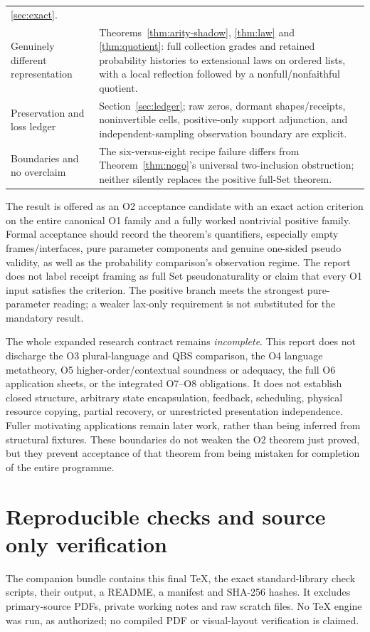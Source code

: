 \documentclass[11pt,a4paper]{article}
\theoremstyle{definition}
\begin{document}
\begin{longtable}{@{}p{.29\linewidth}p{.65\linewidth}@{}}
\ref{sec:exact}.\\
Genuinely different representation&Theorems~\ref{thm:arity-shadow},
\ref{thm:law} and \ref{thm:quotient}: full collection grades and retained
probability histories to extensional laws on ordered lists, with a local
reflection followed by a nonfull/nonfaithful quotient.\\
Preservation and loss ledger&Section~\ref{sec:ledger}; raw zeros, dormant
shapes/receipts, noninvertible cells, positive-only support adjunction, and
independent-sampling observation boundary are explicit.\\
Boundaries and no overclaim&The six-versus-eight recipe failure differs
from Theorem~\ref{thm:nogo}'s universal two-inclusion obstruction; neither
silently replaces the positive full-Set theorem.\\
\bottomrule
\end{longtable}

The result is offered as an O2 acceptance candidate with an exact action
criterion on the entire canonical O1 family and a fully worked nontrivial
positive family. Formal acceptance should record the theorem's quantifiers,
especially empty frames/interfaces, pure parameter components and genuine
one-sided pseudo validity, as well as the probability comparison's observation
regime. The report does not label receipt framing as full Set pseudonaturality
or claim that every O1 input satisfies the criterion. The positive branch
meets the strongest pure-parameter reading; a weaker lax-only requirement
is not substituted for the mandatory result.

The whole expanded research contract remains \emph{incomplete}. This report
does not discharge the O3 plural-language and QBS comparison, the O4 language
metatheory, O5 higher-order/contextual soundness or adequacy, the full O6
application sheets, or the integrated O7--O8 obligations. It does not establish
closed structure, arbitrary state encapsulation, feedback, scheduling,
physical resource copying, partial recovery, or unrestricted presentation
independence. Fuller motivating applications remain later work, rather than
being inferred from structural fixtures. These boundaries do not weaken the
O2 theorem just proved, but they prevent acceptance of that theorem from
being mistaken for completion of the entire programme.

\appendix
\section{Reproducible checks and source only verification}\label{app:checks}
The companion bundle contains this final TeX, the exact standard-library
check scripts, their output, a README, a manifest and SHA-256 hashes. It
excludes primary-source PDFs, private working notes and raw scratch files.
No TeX engine was run, as authorized; no compiled PDF or visual-layout
verification is claimed.
\end{document}
